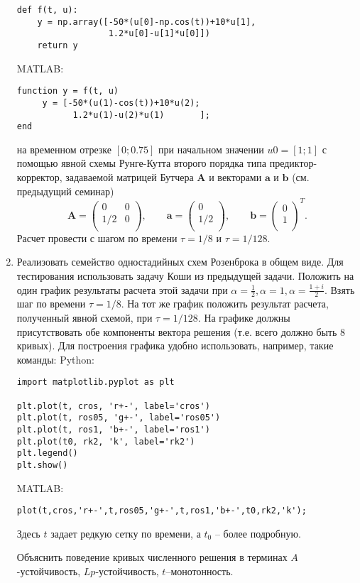 \begin{enumerate}
\begin{verbatim}
def f(t, u):
    y = np.array([-50*(u[0]-np.cos(t))+10*u[1], 
                  1.2*u[0]-u[1]*u[0]])
    return y
\end{verbatim}
MATLAB:
\begin{matlablisting}
	\begin{verbatim}
function y = f(t, u)
     y = [-50*(u(1)-cos(t))+10*u(2); 
           1.2*u(1)-u(2)*u(1)       ];
end		
	\end{verbatim}
\end{matlablisting}
на временном отрезке $[0; 0.75]$
при начальном значении $u0 = [1; 1]$ с помощью явной схемы Рунге-Кутта второго порядка типа предиктор-корректор, задаваемой матрицей Бутчера $\mathbf{A}$ и векторами $\mathbf{a}$ и $\mathbf{b}$ (см. предыдущий семинар)
\begin{equation} \nonumber
	\mathbf{A} = 
		\begin{pmatrix}
		0 & 0 \\
		1/2 & 0 \\
		\end{pmatrix},
	\qquad
	\mathbf{a} = 
		\begin{pmatrix}
		0 \\
		1/2 \\
		\end{pmatrix},
	\qquad
	\mathbf{b} = 
		\begin{pmatrix}
		0 \\
		1 \\
		\end{pmatrix}^T.
\end{equation}
Расчет провести с шагом по времени $\tau = 1/8$ и $\tau = 1/128$.
\item Реализовать семейство одностадийных схем Розенброка в общем виде. Для тестирования использовать задачу Коши из предыдущей задачи. Положить на один график результаты расчета этой задачи при $\alpha = \frac{1}{2}, \alpha = 1, \alpha = \frac{1+i}{2}$. Взять шаг по времени $\tau = 1/8$. На тот же график положить результат расчета, полученный явной схемой, при $\tau = 1/128$. На графике должны присутствовать обе компоненты вектора решения (т.е. всего должно быть 8 кривых). Для построения графика удобно использовать, например, такие команды:
\newpage
Python:
\begin{verbatim}
import matplotlib.pyplot as plt

plt.plot(t, cros, 'r+-', label='cros')
plt.plot(t, ros05, 'g+-', label='ros05')
plt.plot(t, ros1, 'b+-', label='ros1')
plt.plot(t0, rk2, 'k', label='rk2')
plt.legend()
plt.show()
\end{verbatim}
MATLAB:
\begin{matlablisting}
	\begin{verbatim}
plot(t,cros,'r+-',t,ros05,'g+-',t,ros1,'b+-',t0,rk2,'k');
	\end{verbatim}
\end{matlablisting}
Здесь $t$ задает редкую сетку по времени, а $t_0$ – более подробную. 

Объяснить поведение кривых численного решения в терминах $A$-устойчивость, $Lp$-устойчивость, $t$–монотонность.

\end{enumerate}
